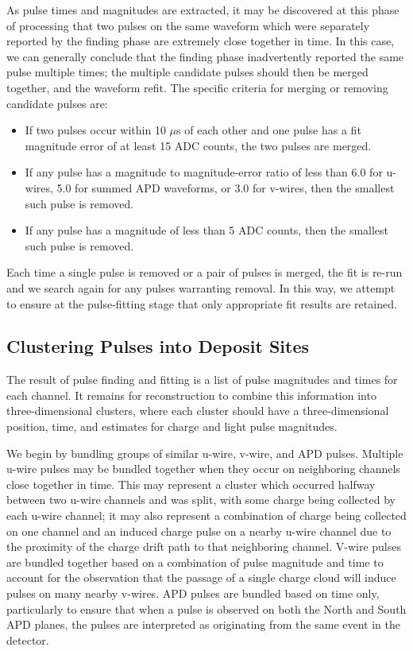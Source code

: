 As pulse times and magnitudes are extracted, it may be discovered at this phase of processing that two pulses on the same waveform which were separately reported by the finding phase are extremely close together in time.  In this case, we can generally conclude that the finding phase inadvertently reported the same pulse multiple times; the multiple candidate pulses should then be merged together, and the waveform refit.  The specific criteria for merging or removing candidate pulses are:~\cite{ReconstructionDocument}
\begin{itemize}
\item If two pulses occur within 10 $\mu$s of each other and one pulse has a fit magnitude error of at least 15 ADC counts, the two pulses are merged.
\item If any pulse has a magnitude to magnitude-error ratio of less than 6.0 for u-wires, 5.0 for summed APD waveforms, or 3.0 for v-wires, then the smallest such pulse is removed.
\item If any pulse has a magnitude of less than 5 ADC counts, then the smallest such pulse is removed.
\end{itemize}
Each time a single pulse is removed or a pair of pulses is merged, the fit is re-run and we search again for any pulses warranting removal.  In this way, we attempt to ensure at the pulse-fitting stage that only appropriate fit results are retained.

\subsection{Clustering Pulses into Deposit Sites}\label{sec:ReconClustering}

The result of pulse finding and fitting is a list of pulse magnitudes and times for each channel.  It remains for reconstruction to combine this information into three-dimensional clusters, where each cluster should have a three-dimensional position, time, and estimates for charge and light pulse magnitudes.

We begin by bundling groups of similar u-wire, v-wire, and APD pulses.  Multiple u-wire pulses may be bundled together when they occur on neighboring channels close together in time.  This may represent a cluster which occurred halfway between two u-wire channels and was split, with some charge being collected by each u-wire channel; it may also represent a combination of charge being collected on one channel and an induced charge pulse on a nearby u-wire channel due to the proximity of the charge drift path to that neighboring channel.  V-wire pulses are bundled together based on a combination of pulse magnitude and time to account for the observation that the passage of a single charge cloud will induce pulses on many nearby v-wires.  APD pulses are bundled based on time only, particularly to ensure that when a pulse is observed on both the North and South APD planes, the pulses are interpreted as originating from the same event in the detector.

